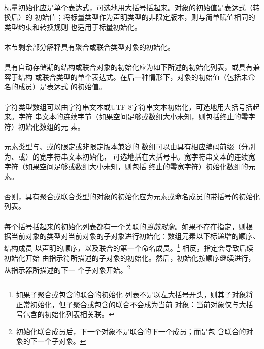 {\paragraph{}
标量初始化应是单个表达式，可选地用大括号括起来。对象的初始值是表达式（转换后）的
初始值；将标量类型作为声明类型的非限定版本，则与简单赋值相同的类型约束和转换规则
也适用于标量初始化。

\paragraph{}
本节剩余部分解释具有聚合或联合类型对象的初始化。

\paragraph{}
具有自动存储期的结构或联合对象的初始化应为如下所述的初始化列表，或具有兼容于结构
或联合类型的单个表达式。在后一种情形下，对象的初始值（包括未命名的成员）是表达式
的初始值。

\paragraph{}
字符类型数组可以由字符串文本或UTF-8字符串文本初始化，可选地用大括号括起来。字符
串文本的连续字节（如果空间足够或数组大小未知，则包括终止的零字符）初始化数组的元
素。

\paragraph{}
元素类型与、或的限定或非限定版本兼容的
数组可以由具有相应编码前缀（分别为、或）的宽字符串文本初始化，
可选地括在大括号中。宽字符串文本的连续宽字符（如果空间足够或数组大小未知，则包括
终止的零宽字符）初始化数组的元素。

\paragraph{}
否则，具有聚合或联合类型的对象的初始化应为元素或命名成员的带括号的初始化列表。

\paragraph{}
每个括号括起来的初始化列表都有一个关联的\textit{当前对象}。如果不存在指定，则根
据当前对象的类型对当前对象的子对象进行初始化：数组元素以下标递增的顺序、结构成员
以声明的顺序，以及联合的第一个命名成员。\footnote{如果子聚合或包含的联合的初始化
列表不是以左大括号开头，则其子对象将正常初始化，但子聚合或包含的联合不会成为当前
对象：当前对象仅与大括号包含的初始化列表相关联。} 相反，指定会导致后续初始化开始
由指示符所描述的子对象的初始化。然后，初始化按顺序继续进行，从指示器所描述的下一
个子对象开始。\footnote{初始化联合成员后，下一个对象不是联合的下一个成员；而是包
含联合的对象的下一个子对象。}

}
